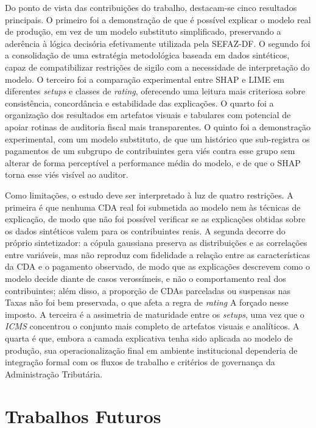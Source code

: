 Do ponto de vista das contribuições do trabalho, destacam-se cinco resultados principais. O primeiro foi a demonstração de que é possível explicar o modelo real de produção, em vez de um modelo substituto simplificado, preservando a aderência à lógica decisória efetivamente utilizada pela SEFAZ-DF. O segundo foi a consolidação de uma estratégia metodológica baseada em dados sintéticos, capaz de compatibilizar restrições de sigilo com a necessidade de interpretação do modelo. O terceiro foi a comparação experimental entre SHAP e LIME em diferentes \textit{setups} e classes de \textit{rating}, oferecendo uma leitura mais criteriosa sobre consistência, concordância e estabilidade das explicações. O quarto foi a organização dos resultados em artefatos visuais e tabulares com potencial de apoiar rotinas de auditoria fiscal mais transparentes. O quinto foi a demonstração experimental, com um modelo substituto, de que um histórico que sub-registra os pagamentos de um subgrupo de contribuintes gera viés contra esse grupo sem alterar de forma perceptível a performance média do modelo, e de que o SHAP torna esse viés visível ao auditor.

Como limitações, o estudo deve ser interpretado à luz de quatro restrições. A primeira é que nenhuma CDA real foi submetida ao modelo nem às técnicas de explicação, de modo que não foi possível verificar se as explicações obtidas sobre os dados sintéticos valem para os contribuintes reais. A segunda decorre do próprio sintetizador: a cópula gaussiana preserva as distribuições e as correlações entre variáveis, mas não reproduz com fidelidade a relação entre as características da CDA e o pagamento observado, de modo que as explicações descrevem como o modelo decide diante de casos verossímeis, e não o comportamento real dos contribuintes; além disso, a proporção de CDAs parceladas ou suspensas nas Taxas não foi bem preservada, o que afeta a regra de \textit{rating} A forçado nesse imposto. A terceira é a assimetria de maturidade entre os \textit{setups}, uma vez que o \textit{ICMS} concentrou o conjunto mais completo de artefatos visuais e analíticos. A quarta é que, embora a camada explicativa tenha sido aplicada ao modelo de produção, sua operacionalização final em ambiente institucional dependeria de integração formal com os fluxos de trabalho e critérios de governança da Administração Tributária.

\section*{Trabalhos Futuros}

